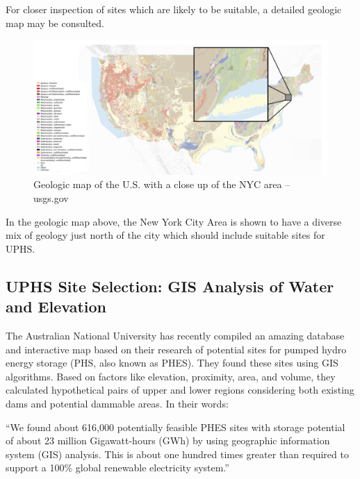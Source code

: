 \documentclass[hidelinks,12pt,a4paper]{article}
\begin{document}
For closer inspection of sites which are likely to be suitable, a detailed geologic map may be consulted.

\begin{figure}[ht!]
    \centering
    \includegraphics[width=1\textwidth]{usgs-gov-map-of-new-york-city-area.png}
    \caption{Geologic map of the U.S. with a close up of the NYC area -- usgs.gov \cite{MineralResourcesOnlineSpatialDataGeologicmaps}}
\end{figure}
\FloatBarrier

In the geologic map above, the New York City Area is shown to have a diverse mix of geology just north of the city which should include suitable sites for UPHS.

\subsection{UPHS Site Selection: GIS Analysis of Water and Elevation}
The Australian National University has recently compiled an amazing database and interactive map based on their research of potential sites for pumped hydro energy storage (PHS, also known as PHES). They found these sites using GIS algorithms. Based on factors like elevation, proximity, area, and volume, they calculated hypothetical pairs of upper and lower regions considering both existing dams and potential dammable areas. In their words:

\begin{displayquote}
“We found about 616,000 potentially feasible PHES sites with storage potential of about 23 million Gigawatt-hours (GWh) by using geographic information system (GIS) analysis. This is about one hundred times greater than required to support a 100\% global renewable electricity system.”
\end{displayquote}
\end{document}
